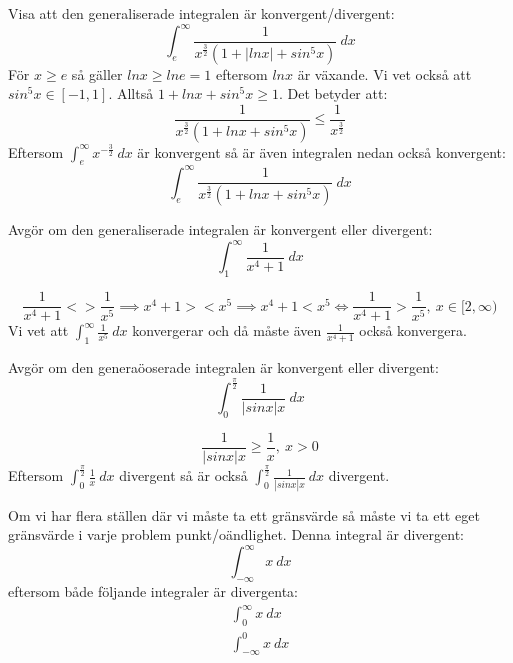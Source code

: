 \documentclass{report}
\begin{document}
\ex{}
{
Visa att den generaliserade integralen är konvergent/divergent:
\begin{equation*}
	\int_{e}^{ \infty} \frac{1}{x^{ \frac{3}{2} } (1 + |lnx| + sin^5x) }  \: dx 
\end{equation*}
För $ x \ge e $ så gäller $ lnx \ge lne = 1 $ eftersom $ lnx $ är växande. Vi vet också att $ sin^5x \in [-1,1] $. Alltså $ 1 + lnx + sin^5x \ge 1 $. Det betyder att:
\begin{equation*}
	\frac{1}{x^{ \frac{3}{2} } (1+ lnx + sin^5x)} \le \frac{1}{x^{ \frac{3}{2} }}  
\end{equation*}
Eftersom $ \int_{e}^{ \infty} x^{- \frac{3}{2} } \: dx $ är konvergent så är även integralen nedan också konvergent:
\begin{equation*}
	\int_{e}^{ \infty} \frac{1}{x^{ \frac{3}{2} }(1+lnx+sin^5x)}  \: dx 
\end{equation*}
}

\qs{}
{
Avgör om den generaliserade integralen är konvergent eller divergent:
\begin{equation*}
\int_{1}^{ \infty} \frac{1}{x^4+1}  \: dx 
\end{equation*}
}

\sol 
\begin{equation*}
\frac{1}{x^4+1} <> \frac{1}{x^5} \implies x^4+1 >< x^5 \implies x^4+1 < x^5 \iff \frac{1}{x^4+1} > \frac{1}{x^5},\: x \in [2, \infty)  
\end{equation*}
Vi vet att $ \int_{1}^{ \infty} \frac{1}{x^5}  \: dx  $ konvergerar och då måste även $ \frac{1}{x^4+1}  $ också konvergera.

\pagebreak
\qs{}
{
Avgör om den generaöoserade integralen är konvergent eller divergent:
\begin{equation*}
\int_{0}^{ \frac{\pi}{2} } \frac{1}{|sinx|x}  \: dx 
\end{equation*}
}

\sol 
\begin{equation*}
\frac{1}{|sinx|x} \ge \frac{1}{x},\:x > 0
\end{equation*}
Eftersom $ \int_{0}^{ \frac{\pi}{2} } \frac{1}{x}  \: dx  $ divergent så är också $ \int_{0}^{ \frac{\pi}{2} } \frac{1}{|sinx|x}  \: dx  $ divergent.

\vspace{80pt}
\noindent
Om vi har flera ställen där vi måste ta ett gränsvärde så måste vi ta ett eget gränsvärde i varje problem punkt/oändlighet.
\ex{}
{
Denna integral är divergent:
\begin{equation*}
\int_{- \infty}^{ \infty} x \: dx 
\end{equation*}
eftersom både följande integraler är divergenta:
\begin{align*}
\int_{0}^{ \infty} x \: dx\\
\int_{- \infty}^{0} x \: dx 
\end{align*}
}
\end{document}
